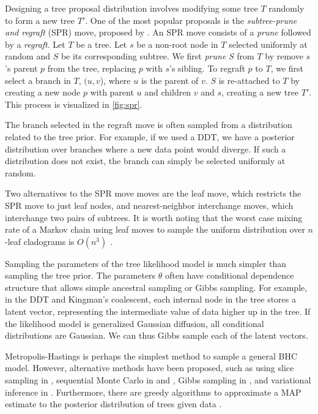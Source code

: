 \documentclass{article}
\begin{document}
Designing a tree proposal distribution
involves modifying some tree $T$ 
randomly to form a new tree $T'$.
One of the most popular proposals
is the \emph{subtree-prune and regraft} (SPR) move, proposed by \citep{Swofford1990}.
An SPR move consists of a \emph{prune} followed by a \emph{regraft}.
Let $T$ be a tree.
Let $s$ be a non-root
node in $T$ selected uniformly at random
and $S$ be its corresponding subtree.
We first \emph{prune}
$S$ from $T$ by
remove $s$'s parent $p$ from the tree,
replacing $p$ with $s$'s sibling.
To regraft $p$ to $T$,
we first select a branch in $T$,
$(u, v$), where $u$ is the parent of $v$.
$S$ is re-attached to $T$
by creating a new node $p$
with parent $u$ and children $v$ and $s$,
creating a new tree $T'$.
This process is visualized in \autoref{fig:spr}.

The branch selected in the regraft move
is often sampled from a distribution
related to the tree prior.
For example, if we used a DDT,
we have a posterior distribution
over branches where a new data point would 
diverge. If such a distribution
does not exist, the branch can simply
be selected uniformly at random.

Two alternatives to the SPR move
moves are the leaf move,
which restricts the SPR move
to just leaf nodes,
and nearest-neighbor interchange
moves, which interchange
two pairs of subtrees.
It is worth noting
that 
the worst case mixing rate of
a Markov chain using
leaf moves to sample
the uniform distribution over
$n$-leaf cladograms is $O(n^3)$ \citep{Aldous2000}.

Sampling the parameters of 
the tree likelihood model is much simpler
than sampling the tree prior.
The parameters $\theta$ often
have conditional dependence
structure that allows simple
ancestral sampling or Gibbs sampling.
For example, in the DDT and Kingman's coalescent,
each internal node in the tree stores
a latent vector, representing the intermediate value
of data higher up in the tree.
If the likelihood model is
generalized Gaussian diffusion,
all conditional distributions are Gaussian.
We can thus Gibbs sample each of the
latent vectors.

Metropolis-Hastings is perhaps the
simplest method to sample a general
BHC model. However, alternative methods
have been proposed,
such as using slice sampling in \citep{Adams2010},
sequential Monte Carlo in \citep{Teh2009} and \citep{Hu2013},
Gibbs sampling in \citep{Blei2010},
and variational inference in \citep{Paisley2014}.
Furthermore, there are greedy algorithms
to approximate a MAP estimate
to the posterior distribution
of trees given data \citep{Teh2009, Hu2013}.
\end{document}
